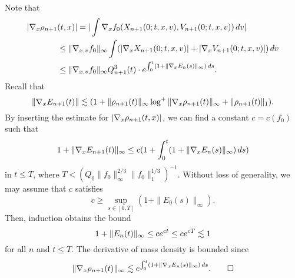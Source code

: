 \documentclass[11pt]{amsart}
\begin{document}
\begin{pfs}
Note that
\begin{align*}
|\nabla_x\rho_{n+1}&(t,x)|
=|\int\nabla_xf_0(X_{n+1}(0;t,x,v),V_{n+1}(0;t,x,v))\,dv|\\
&\le\|\nabla_{x,v}f_0\|_\infty\int(|\nabla_xX_{n+1}(0;t,x,v)|+|\nabla_xV_{n+1}(0;t,x,v)|)\,dv\\
&\le\|\nabla_{x,v}f_0\|_\infty Q_{n+1}^3(t)\cdot e^{\int_0^t(1+\|\nabla_xE_n(s)\|_\infty)\,ds}.
\end{align*}
Recall that
\[\|\nabla_xE_{n+1}(t)\|\lesssim(1+\|\rho_{n+1}(t)\|_\infty\log^+\|\nabla_x\rho_{n+1}(t)\|_\infty+\|\rho_{n+1}(t)\|_1).\]
By inserting the estimate for $|\nabla_x\rho_{n+1}(t,x)|$, we can find a constant $c=c(f_0)$ such that
\begin{align*}
1+\|\nabla_xE_{n+1}(t)\|_\infty\le c(1+\int_0^t(1+\|\nabla_xE_n(s)\|_\infty)\,ds)
\end{align*}
in $t\le T$, where $T<(Q_0\|f_0\|_\infty^{2/3}\|f_0\|_1^{1/3})^{-1}$.
Without loss of generality, we may assume that $c$ satisfies
\[c\ge\sup_{s\in[0,T]}(1+\|E_0(s)\|_\infty).\]
Then, induction obtains the bound
\[1+\|E_n(t)\|_\infty\le ce^{ct}\le ce^{cT}\lesssim1\]
for all $n$ and $t\le T$.
The derivative of mass density is bounded since
\[\|\nabla_x\rho_{n+1}(t)\|_\infty\lesssim e^{\int_0^t(1+\|\nabla_xE_n(s)\|_\infty)\,ds}.\qedhere\]
\end{pfs}
\end{document}

